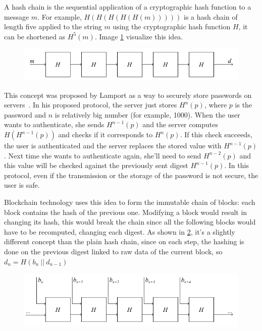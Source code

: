 A hash chain is the sequential application of a cryptographic hash function to a message $m$. For example, $H(H(H(H(H(m)))))$ is a hash chain of length five applied to the string $m$ using the cryptographic hash function $H$, it can be shortened as $H^5(m)$. Image \ref{fig:hash-chain-1} visualize this idea.

\begin{figure}[H]
  \centering
  \includegraphics[width=1\textwidth]{Figures/background/hashchain_1.jpg}
  \caption[Hash chain]{}
  \label{fig:hash-chain-1}
\end{figure}

This concept was proposed by Lamport as a way to securely store passwords on servers~\cite{hashchain}. In his proposed protocol, the server just stores $H^n(p)$, where $p$ is the password and $n$ is relatively big number (for example, 1000). When the user wants to authenticate, she sends $H^{n-1}(p)$ and the server computes $H(H^{n-1}(p))$ and checks if it corresponds to $H^n(p)$. If this check succeeds, the user is authenticated and the server replaces the stored value with $H^{n-1}(p)$. Next time she wants to authenticate again, she'll need to send $H^{n-2}(p)$ and this value will be checked against the previously sent digest $H^{n-1}(p)$. In this protocol, even if the transmission or the storage of the password is not secure, the user is safe.

Blockchain technology uses this idea to form the immutable chain of blocks: each block contains the hash of the previous one. Modifying a block would result in changing its hash, this would break the chain since all the following blocks would have to be recomputed, changing each digest. As shown in \cref{fig:hash-chain-2}, it's a slightly different concept than the plain hash chain, since on each step, the hashing is done on the previous digest linked to raw data of the current block, so $d_{n}=H(b_n~||~d_{n-1})$

\begin{figure}[H]
  \centering
  \includegraphics[width=1\textwidth]{Figures/background/hashchain_2.jpg}
  \caption[Hash chain in blockchain]{}
  \label{fig:hash-chain-2}
\end{figure}

